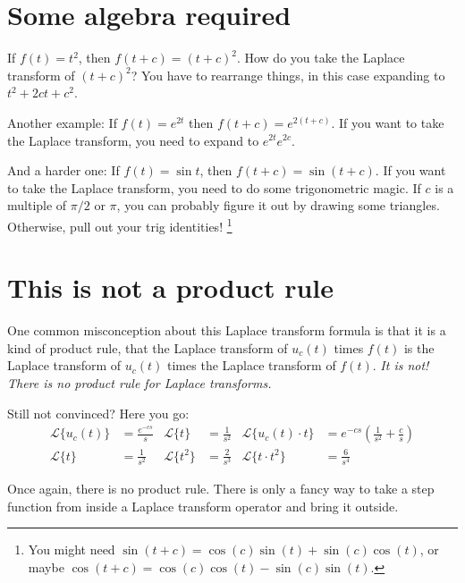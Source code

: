 \documentclass[11pt,letterpaper,oneside]{scrartcl}
\renewcommand{\L}[1]{\mathcal L\{#1\}}
\begin{document}
\section{Some algebra required}

If $f(t)=t^2$, then $f(t+c)=(t+c)^2$. How do you take the Laplace
transform of $(t+c)^2$? You have to rearrange things,
in this case expanding to $t^2 + 2ct + c^2$.

Another example: If $f(t)=e^{2t}$ then
$f(t+c)=e^{2(t+c)}$. If you want to take the Laplace transform,
you need to expand to $e^{2t}e^{2c}$.

And a harder one: If $f(t)=\sin t$, then $f(t+c)=\sin(t+c)$.
If you want to take the Laplace transform, you need to do some
trigonometric magic. If $c$ is a multiple of $\pi/2$ or $\pi$,
you can probably figure it out by drawing some triangles.
Otherwise, pull out your trig identities!%
\footnote{You might need $\sin(t+c) = \cos(c)\sin(t) + \sin(c)\cos(t)$, or
maybe
$\cos(t+c) = \cos(c)\cos(t) - \sin(c)\sin(t)$.}

\section{This is not a product rule}

One common misconception about this Laplace transform
 formula is that it is a kind
of product rule, that the Laplace transform of $u_c(t)$ times $f(t)$ is the
Laplace transform of $u_c(t)$ times the Laplace transform of $f(t)$.
\emph{It is not! There is no product rule for Laplace transforms.}

Still not convinced? Here you go:
\begin{align*}
	\L{u_c(t)} &= \frac{e^{-cs}}{s}
	& \L{t} &= \frac{1}{s^2}
	& \L{u_c(t) \cdot t } &= e^{-cs}\left(\frac{1}{s^2} + \frac{c}{s}\right) \\
	\L{t} &= \frac{1}{s^2}
	& \L{t^2} &= \frac{2}{s^3}
	& \L{t\cdot t^2} &= \frac{6}{s^4}
\end{align*}

Once again, there is no product rule. There is only a fancy way to take
a step function from inside a Laplace transform operator and bring
it outside.
\end{document}
